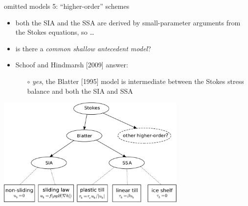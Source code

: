 \begin{frame}{omitted models 5: ``higher-order'' schemes}

\begin{itemize}
\item both the SIA and the SSA are derived by small-parameter arguments from the Stokes equations, so \dots
\item is there a \emph{common shallow antecedent model}?
\item Schoof and Hindmarsh [2009]\nocite{SchoofHindmarsh} answer:
  \begin{itemize}
  \item[$\circ$] \emph{yes}, the Blatter [1995]\nocite{Blatter} model is  intermediate between the Stokes stress balance and both the SIA and SSA
  \end{itemize}
\end{itemize}

\begin{center}
\includegraphics[width=0.7\textwidth]{photos/hierarchy}
\end{center}
\end{frame}
